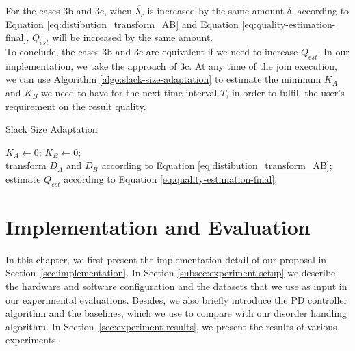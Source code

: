 \documentclass[a4paper, 11pt, twoside]{report}
\begin{document}
For the cases 3b and 3c, when $\overline{\lambda _r}$ is increased by the same amount $\delta$, according to Equation \ref{eq:distibution_transform_AB} and Equation \ref{eq:quality-estimation-final}, $Q_{est}$ will be increased by the same amount.\\

To conclude, the cases 3b and 3c are equivalent if we need to increase $Q_{est}$. In our implementation, we take the approach of 3c. At any time of the join execution, we can use Algorithm \ref{algo:slack-size-adaptation} to estimate the minimum $K_A$ and $K_B$ we need to have for the next time interval $T$, in order to fulfill the user's requirement on the result quality.\\

\begin{algorithm}[H]
\caption{Slack Size Adaptation\label{algo:slack-size-adaptation}}
$K_A \gets 0$; $K_B \gets 0$;\\
transform $D_A$ and $D_B$ according to Equation \ref{eq:distibution_transform_AB};\\
estimate $Q_{est}$ according to Equation \ref{eq:quality-estimation-final};\\
\end{algorithm}

\cleardoublepage

\chapter{Implementation and Evaluation}
In this chapter, we first present the implementation detail of our proposal in Section~\ref{sec:implementation}. In Section \ref{subsec:experiment setup} we describe the hardware and software configuration and the datasets that we use as input in our experimental evaluations. Besides, we also briefly introduce the PD controller algorithm and the baselines, which we use to compare with our disorder handling algorithm. In Section~\ref {sec:experiment results}, we present the results of various experiments.\\
\end{document}
